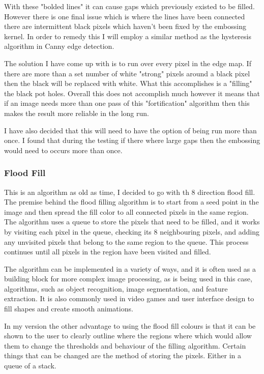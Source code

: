 \begin{FlushLeft}
    With these "bolded lines" it can cause gaps which previously existed to be filled. However there is one final issue which is where the lines have been connected there are intermittent black pixels which haven't been fixed by the embossing kernel. In order to remedy this I will employ a similar method as the hysteresis algorithm in Canny edge detection. \\ \bk
    
    The solution I have come up with is to run over every pixel in the edge map. If there are more than a set number of white "strong" pixels around a black pixel then the black will be replaced with white. What this accomplishes is a "filling" the black pot holes. Overall this does not accomplish much however it means that if an image needs more than one pass of this "fortification" algorithm then this makes the result more reliable in the long run. \\ \bk

    I have also decided that this will need to have the option of being run more than once. I found that during the testing if there where large gaps then the embossing would need to occurs more than once.\\
    \bk

    \subsubsection{Flood Fill}
    This is an algorithm as old as time, I decided to go with th 8 direction flood fill. The premise behind the flood filling algorithm is to start from a seed point in the image and then spread the fill color to all connected pixels in the same region. The algorithm uses a queue to store the pixels that need to be filled, and it works by visiting each pixel in the queue, checking its 8 neighbouring pixels, and adding any unvisited pixels that belong to the same region to the queue. This process continues until all pixels in the region have been visited and filled. \\ \bk

    The algorithm can be implemented in a variety of ways, and it is often used as a building block for more complex image processing, as is being used in this case, algorithms, such as object recognition, image segmentation, and feature extraction. It is also commonly used in video games and user interface design to fill shapes and create smooth animations. \\ \bk

    In my version the other advantage to using the flood fill colours is that it can be shown to the user to clearly outline where the regions where which would allow them to change the thresholds and behaviour of the filling algorithm. Certain things that can be changed are the method of storing the pixels. Either in a queue of a stack. \\ 
    \bk


\end{FlushLeft}
